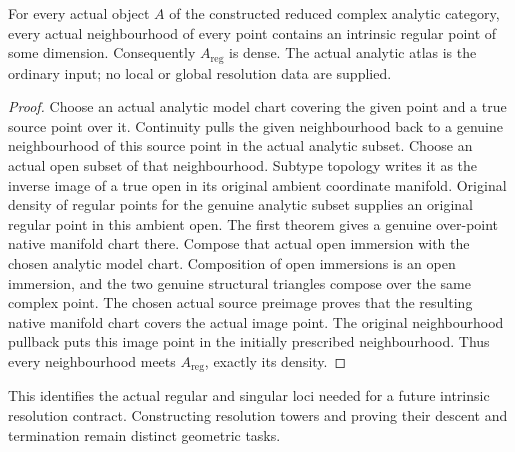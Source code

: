 \begin{theorem}
\label{hir:intrinsic-complex-analytic-regular-locus-dense}
\leanok
For every actual object $A$ of the constructed reduced complex analytic
category, every actual neighbourhood of every point contains an intrinsic
regular point of some dimension. Consequently $A_{\mathrm{reg}}$ is dense.
The actual analytic atlas is the ordinary input; no local or global
resolution data are supplied.
\end{theorem}
\begin{proof}
Choose an actual analytic model chart covering the given point and a true
source point over it. Continuity pulls the given neighbourhood back to
a genuine neighbourhood of this source point in the actual analytic subset.
Choose an actual open subset of that neighbourhood. Subtype topology
writes it as the inverse image of a true open in its original ambient
coordinate manifold. Original density of regular points for the genuine
analytic subset supplies an original regular point in this ambient open.
The first theorem gives a genuine over-point native manifold chart there.
Compose that actual open immersion with the chosen analytic model chart.
Composition of open immersions is an open immersion, and the two genuine
structural triangles compose over the same complex point. The chosen
actual source preimage proves that the resulting native manifold chart
covers the actual image point. The original neighbourhood pullback puts
this image point in the initially prescribed neighbourhood. Thus every
neighbourhood meets $A_{\mathrm{reg}}$, exactly its density.
\end{proof}

This identifies the actual regular and singular loci needed for a future
intrinsic resolution contract. Constructing resolution towers and proving
their descent and termination remain distinct geometric tasks.
